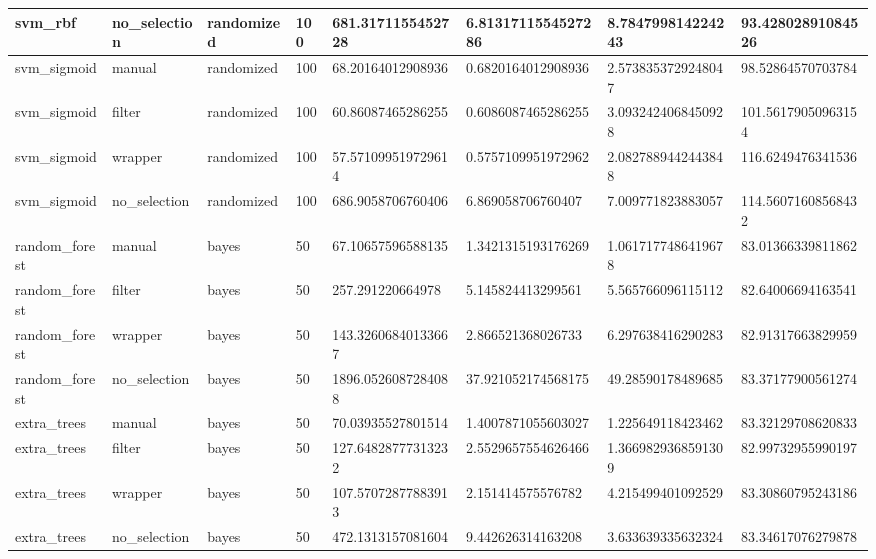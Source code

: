 {\begin{longtable}[c]{@{}llllllll@{}}
	\rowcolor[HTML]{EFEFEF} 
	svm\_rbf           & no\_selection & randomized & 100 & 681.3171155452728      & 6.8131711554527286     & 8.784799814224243      & 93.42802891084526  \\* \midrule
	svm\_sigmoid       & manual        & randomized & 100 & 68.20164012908936      & 0.6820164012908936     & 2.5738353729248047     & 98.52864570703784  \\
	\rowcolor[HTML]{EFEFEF} 
	svm\_sigmoid       & filter        & randomized & 100 & 60.86087465286255      & 0.6086087465286255     & 3.0932424068450928     & 101.56179050963154 \\
	svm\_sigmoid       & wrapper       & randomized & 100 & 57.571099519729614     & 0.5757109951972962     & 2.0827889442443848     & 116.6249476341536  \\
	\rowcolor[HTML]{EFEFEF} 
	svm\_sigmoid       & no\_selection & randomized & 100 & 686.9058706760406      & 6.869058706760407      & 7.009771823883057      & 114.56071608568432 \\* \midrule
	random\_forest     & manual        & bayes      & 50  & 67.10657596588135      & 1.3421315193176269     & 1.0617177486419678     & 83.01366339811862  \\
	\rowcolor[HTML]{EFEFEF} 
	random\_forest     & filter        & bayes      & 50  & 257.291220664978       & 5.145824413299561      & 5.565766096115112      & 82.64006694163541  \\
	random\_forest     & wrapper       & bayes      & 50  & 143.32606840133667     & 2.866521368026733      & 6.297638416290283      & 82.91317663829959  \\
	\rowcolor[HTML]{EFEFEF} 
	random\_forest     & no\_selection & bayes      & 50  & 1896.0526087284088     & 37.921052174568175     & 49.28590178489685      & 83.37177900561274  \\* \midrule
	extra\_trees       & manual        & bayes      & 50  & 70.03935527801514      & 1.4007871055603027     & 1.225649118423462      & 83.32129708620833  \\
	\rowcolor[HTML]{EFEFEF} 
	extra\_trees       & filter        & bayes      & 50  & 127.64828777313232     & 2.5529657554626466     & 1.3669829368591309     & 82.99732955990197  \\
	extra\_trees       & wrapper       & bayes      & 50  & 107.57072877883913     & 2.151414575576782      & 4.215499401092529      & 83.30860795243186  \\
	\rowcolor[HTML]{EFEFEF} 
	extra\_trees       & no\_selection & bayes      & 50  & 472.1313157081604      & 9.442626314163208      & 3.633639335632324      & 83.34617076279878  \\* \midrule

\end{longtable}}
